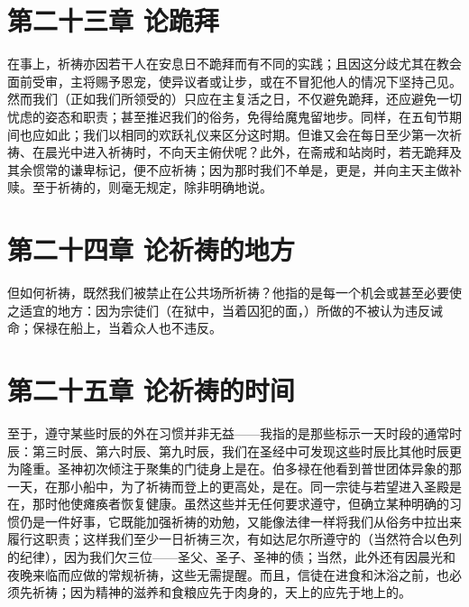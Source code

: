\section{第二十三章  论跪拜}

在事上，祈祷亦因若干人在安息日不跪拜而有不同的实践；且因这分歧尤其在教会面前受审，主将赐予恩宠，使异议者或让步，或在不冒犯他人的情况下坚持己见。然而我们（正如我们所领受的）只应在主复活之日，不仅避免跪拜，还应避免一切忧虑的姿态和职责；甚至推迟我们的俗务，免得给魔鬼留地步。同样，在五旬节期间也应如此；我们以相同的欢跃礼仪来区分这时期。但谁又会在每日至少第一次祈祷、在晨光中进入祈祷时，不向天主俯伏呢？此外，在斋戒和站岗时，若无跪拜及其余惯常的谦卑标记，便不应祈祷；因为那时我们不单是，更是，并向主天主做补赎。至于祈祷的，则毫无规定，除非明确地说。\par


\section{第二十四章  论祈祷的地方}

但如何祈祷，既然我们被禁止在公共场所祈祷？他指的是每一个机会或甚至必要使之适宜的地方：因为宗徒们（在狱中，当着囚犯的面，）所做的不被认为违反诫命；保禄在船上，当着众人也不违反。\par


\section{第二十五章  论祈祷的时间}

至于，遵守某些时辰的外在习惯并非无益——我指的是那些标示一天时段的通常时辰：第三时辰、第六时辰、第九时辰，我们在圣经中可发现这些时辰比其他时辰更为隆重。圣神初次倾注于聚集的门徒身上是在。伯多禄在他看到普世团体异象的那一天，在那小船中，为了祈祷而登上的更高处，是在。同一宗徒与若望进入圣殿是在，那时他使瘫痪者恢复健康。虽然这些并无任何要求遵守，但确立某种明确的习惯仍是一件好事，它既能加强祈祷的劝勉，又能像法律一样将我们从俗务中拉出来履行这职责；这样我们至少一日祈祷三次，有如达尼尔所遵守的（当然符合以色列的纪律），因为我们欠三位——圣父、圣子、圣神的债；当然，此外还有因晨光和夜晚来临而应做的常规祈祷，这些无需提醒。而且，信徒在进食和沐浴之前，也必须先祈祷；因为精神的滋养和食粮应先于肉身的，天上的应先于地上的。\par

